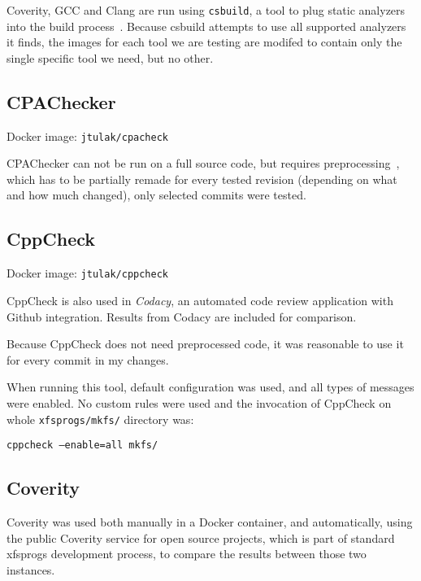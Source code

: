 Coverity, GCC and Clang are run using {\tt csbuild}, a tool to plug static
analyzers into the build process~\cite{csbuildMan}. Because csbuild attempts to
use all supported analyzers it finds, the images for each tool we are testing
are modifed to contain only the single specific tool we need, but no other.
\subsection{CPAChecker}
Docker image: {\tt jtulak/cpacheck}~\cite{dockerCPAChecker}

CPAChecker can not be run on a full source code, but requires
preprocessing~\cite{cpacheckerGettingStarted}, which has to be partially
remade for every tested revision (depending on what and how much changed),
       only selected commits were tested.
\subsection{CppCheck}
Docker image: {\tt jtulak/cppcheck}~\cite{dockerCPPCheck}

CppCheck is also used in {\em Codacy}, an automated code review application
with Github integration. Results from Codacy are included for comparison.

Because CppCheck does not need preprocessed code, it was reasonable to use
it for every commit in my changes.

When running this tool, default configuration was used, and all types of
messages were enabled. No custom rules were used and the invocation of
CppCheck on whole {\tt xfsprogs/mkfs/} directory was:

{\tt cppcheck --enable=all mkfs/}



\subsection{Coverity}
Coverity was used both manually in a Docker container, and automatically,
using the public Coverity service for open source projects, which is part
of standard xfsprogs development process, to compare the results between
those two instances.


